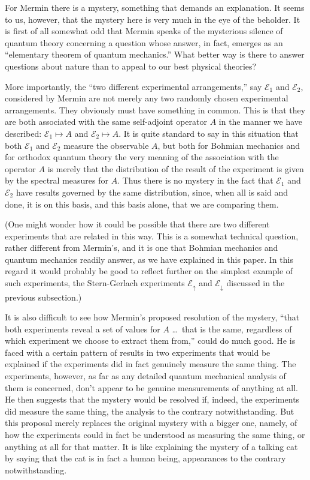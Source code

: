 \documentclass[12pt]{article}
\newcommand{\sa}{self-adjoint}
\newcommand{\BM}{Bohmian mechanics}
\newcommand{\E}{\mbox{$\mathscr{E}$}}
\newcommand{\oqt}{orthodox quantum theory}
\begin{document}
For Mermin there is a mystery, something that demands an explanation.
It seems to us, however, that the mystery here is very much in the eye
of the beholder. It is first of all somewhat odd that Mermin speaks of
the mysterious silence of quantum theory concerning a question whose
answer, in fact, emerges as an ``elementary theorem of quantum
mechanics.'' What better way is there to answer questions about nature
than to appeal to our best physical theories?

More importantly, the ``two different experimental arrangements,'' say
$\E_1$ and $\E_2$, considered by Mermin are not merely any two
randomly chosen experimental arrangements. They obviously must have
something in common. This is that they are both associated with the
same \sa{} operator $A$ in the manner we have described: $\E_1\mapsto
A $ and $\E_2\mapsto A$. It is quite standard to say in this situation
that both $\E_1$ and $\E_2$ measure the observable $A$, but both for
\BM{} and for \oqt{} the very meaning of the association with the
operator $A$ is merely that the distribution of the result of the
experiment is given by the spectral measures for $A$.  Thus there is
no mystery in the fact that $\E_1$ and $\E_2$ have results governed by
the same distribution, since, when all is said and done, it is on this
basis, and this basis alone, that we are comparing them.

(One might wonder how it could be possible that there are two
different experiments that are related in this way. This is a somewhat
technical question, rather different {}from Mermin's, and it is one
that \BM{} and quantum mechanics readily answer, as we have explained
in this paper. In this regard it would probably be good to reflect
further on the simplest example of such experiments, the Stern-Gerlach
experiments $\E_{\uparrow}$ and $\E_{\downarrow}$ discussed in the
previous subsection.)

It is also difficult to see how Mermin's proposed resolution of the
mystery, ``that both experiments reveal a set of values for $A$ \dots\
that is the same, regardless of which experiment we choose to extract
them {}from,'' could do much good. He is faced with a certain pattern
of results in two experiments that would be explained if the
experiments did in fact genuinely measure the same thing.  The
experiments, however, as far as any detailed quantum mechanical
analysis of them is concerned, don't appear to be genuine measurements
of anything at all.  He then suggests that the mystery would be
resolved if, indeed, the experiments did measure the same thing, the
analysis to the contrary notwithstanding. But this proposal merely
replaces the original mystery with a bigger one, namely, of how the
experiments could in fact be understood as measuring the same thing,
or anything at all for that matter. It is like explaining the mystery
of a talking cat by saying that the cat is in fact a human being,
appearances to the contrary notwithstanding.  \bigskip
\end{document}
